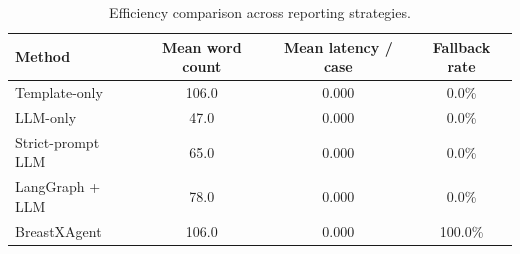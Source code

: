 \begin{table}[t]
\centering
\caption{Efficiency comparison across reporting strategies.}
\label{tab:reporting-efficiency}
\begin{tabular}{lccc}
\toprule
Method & Mean word count & Mean latency / case & Fallback rate \\
\midrule
Template-only & 106.0 & 0.000 & 0.0\% \\
LLM-only & 47.0 & 0.000 & 0.0\% \\
Strict-prompt LLM & 65.0 & 0.000 & 0.0\% \\
LangGraph + LLM & 78.0 & 0.000 & 0.0\% \\
BreastXAgent & 106.0 & 0.000 & 100.0\% \\
\bottomrule
\end{tabular}
\end{table}
